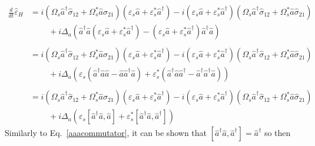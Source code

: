 \documentclass[aps,pra,showpacs,amsmath,amssymb,nofootinbib,longbibliography,superscriptaddress
]{revtex4-1}
\theoremstyle{definition}
\theoremstyle{remark}
\newcommand{\0}{\hat{0}}
\begin{document}
\begin{align}
    \frac{d}{dt}\hat{\varepsilon}_H
    &=
    i \left(\Omega_{s} \hat{a}^{\dagger} \hat{\sigma}_{12} + \Omega_{s}^* \hat{a} \hat{\sigma}_{21}\right) (\varepsilon_s \hat{a} + \varepsilon_s^* \hat{a}^{\dagger}) - i (\varepsilon_s \hat{a} + \varepsilon_s^* \hat{a}^{\dagger})
    \left(\Omega_{s} \hat{a}^{\dagger} \hat{\sigma}_{12} + \Omega_{s}^* \hat{a} \hat{\sigma}_{21}\right) \nonumber \\
    &\;\;\;\;\;\;\;\;+
    i \Delta_a \left(\hat{a}^{\dagger}\hat{a} (\varepsilon_s \hat{a} + \varepsilon_s^* \hat{a}^{\dagger}) -
    (\varepsilon_s \hat{a} + \varepsilon_s^* \hat{a}^{\dagger}) \hat{a}^{\dagger}\hat{a}\right)\nonumber \\\nonumber \\
    &=
    i \left(\Omega_{s} \hat{a}^{\dagger} \hat{\sigma}_{12} + \Omega_{s}^* \hat{a} \hat{\sigma}_{21}\right) (\varepsilon_s \hat{a} + \varepsilon_s^* \hat{a}^{\dagger}) - i (\varepsilon_s \hat{a} + \varepsilon_s^* \hat{a}^{\dagger})
    \left(\Omega_{s} \hat{a}^{\dagger} \hat{\sigma}_{12} + \Omega_{s}^* \hat{a} \hat{\sigma}_{21}\right) \nonumber \\
    &\;\;\;\;\;\;\;\;+
    i \Delta_a \left(\varepsilon_s \left(\hat{a}^{\dagger}\hat{a} \hat{a} - \hat{a} \hat{a}^{\dagger}\hat{a} \right) + \varepsilon_s^* \left(\hat{a}^{\dagger}\hat{a} \hat{a}^{\dagger} - \hat{a}^{\dagger} \hat{a}^{\dagger}\hat{a}\right)\right)\nonumber \\\nonumber \\
    &=
    i \left(\Omega_{s} \hat{a}^{\dagger} \hat{\sigma}_{12} + \Omega_{s}^* \hat{a} \hat{\sigma}_{21}\right) (\varepsilon_s \hat{a} + \varepsilon_s^* \hat{a}^{\dagger}) - i (\varepsilon_s \hat{a} + \varepsilon_s^* \hat{a}^{\dagger})
    \left(\Omega_{s} \hat{a}^{\dagger} \hat{\sigma}_{12} + \Omega_{s}^* \hat{a} \hat{\sigma}_{21}\right) \nonumber \\
    &\;\;\;\;\;\;\;\;+
    i \Delta_a \left(\varepsilon_s \left[\hat{a}^{\dagger}\hat{a}, \hat{a}\right] + \varepsilon_s^* \left[\hat{a}^{\dagger}\hat{a}, \hat{a}^{\dagger}\right]\right)
\end{align}
Similarly to Eq.~\ref{aaacommutator}, it can be shown that $\left[\hat{a}^{\dagger}\hat{a}, \hat{a}^{\dagger}\right] = \hat{a}^{\dagger}$ so then
\end{document}

